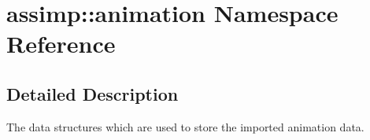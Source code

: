 \hypertarget{namespaceassimp_1_1animation}{\section{assimp\+:\+:animation Namespace Reference}
\label{namespaceassimp_1_1animation}
}


\subsection{Detailed Description}
The data structures which are used to store the imported animation data. 